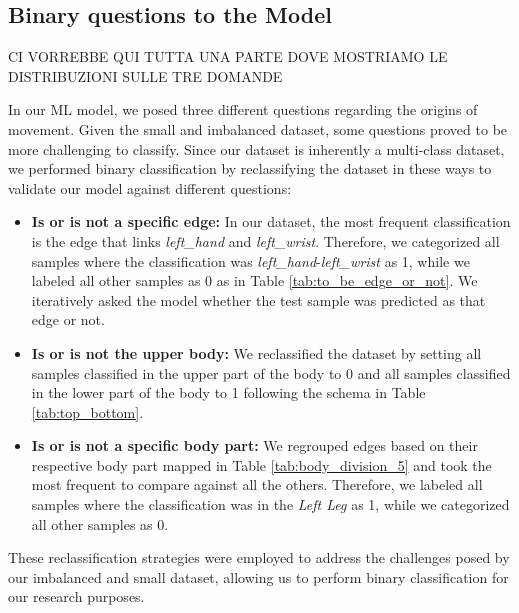 \subsection{Binary questions to the Model}

CI VORREBBE QUI TUTTA UNA PARTE DOVE MOSTRIAMO LE DISTRIBUZIONI SULLE TRE DOMANDE


In our ML model, we posed three different questions regarding the origins of movement. 
Given the small and imbalanced dataset, some questions proved to be more challenging to classify. 
Since our dataset is inherently a multi-class dataset, we performed binary classification by reclassifying the dataset in these ways to validate our model against different questions:

\begin{itemize}

    \item \textbf{Is or is not a specific edge:} In our dataset, the most frequent classification is the edge that links \textit{left\_hand} and \textit{left\_wrist}. 
    Therefore, we categorized all samples where the classification was \textit{left\_hand}-\textit{left\_wrist} as 1, while we labeled all other samples as 0 as in Table \ref{tab:to_be_edge_or_not}. 
    We iteratively asked the model whether the test sample was predicted as that edge or not.  
    
    \item \textbf{Is or is not the upper body:} We reclassified the dataset by setting all samples classified in the upper part of the body to 0 and all samples classified in the lower part of the body to 1 following the schema in Table \ref{tab:top_bottom}.
    
    \item \textbf{Is or is not a specific body part:} We regrouped edges based on their respective body part mapped in Table \ref{tab:body_division_5} and took the most frequent to compare against all the others.
    Therefore, we labeled all samples where the classification was in the \textit{Left Leg} as 1, while we categorized all other samples as 0.

\end{itemize}
These reclassification strategies were employed to address the challenges posed by our imbalanced and small dataset, allowing us to perform binary classification for our research purposes.

